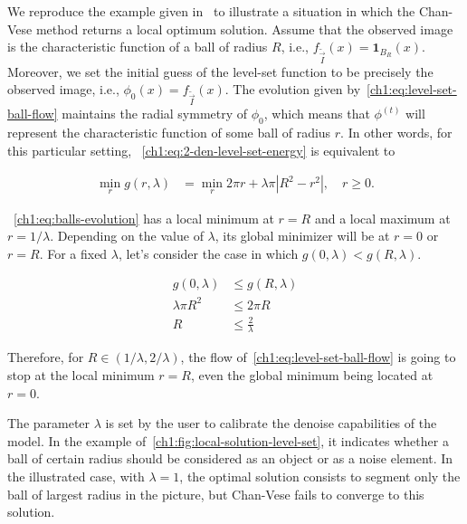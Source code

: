 We reproduce the example given in~\cite{chan06} to illustrate a situation in which the Chan-Vese method returns a local optimum solution. Assume that the observed image is the characteristic function of a ball of radius $R$, i.e., $f_{\widetilde{\vec{I}}}(x) = \mathbf{1}_{B_R}(x)$. Moreover, we set the initial guess of the level-set function to be precisely the observed image, i.e., $\phi_0(x) = f_{\widetilde{\vec{I}}}(x)$. The evolution given by~\cref{ch1:eq:level-set-ball-flow} maintains the radial symmetry of $\phi_0$, which means that $\phi^{(t)}$ will represent the characteristic function of some ball of radius $r$. In other words, for this particular setting, ~\cref{ch1:eq:2-den-level-set-energy} is equivalent to

\begin{align}
	\min_{r} g(r,\lambda) &= \min_r 2\pi r + \lambda \pi |R^2-r^2|, \quad r \geq 0.
	\label{ch1:eq:balls-evolution}
\end{align}


~\cref{ch1:eq:balls-evolution} has a local minimum at $r=R$ and a local maximum at $r=1/\lambda$. Depending on the value of $\lambda$, its global minimizer will be at $r=0$ or $r=R$. For a fixed $\lambda$, let's consider the case in which $g(0,\lambda) < g(R,\lambda)$.

\begin{align*}
	g(0,\lambda) &\leq g(R,\lambda) \\
	\lambda \pi R^2 &\leq 2\pi R \\
	R &\leq \frac{2}{\lambda}
\end{align*}

Therefore, for $R \in (1/\lambda, 2/\lambda)$, the flow of~\cref{ch1:eq:level-set-ball-flow} is going to stop at the local minimum $r=R$, even the global minimum being located at $r=0$. 

The parameter $\lambda$ is set by the user to calibrate the denoise capabilities of the model. In the example of~\cref{ch1:fig:local-solution-level-set}, it indicates whether a ball of certain radius should be considered as an object or as a noise element. In the illustrated case, with $\lambda=1$, the optimal solution consists to segment only the ball of largest radius in the picture, but Chan-Vese fails to converge to this solution.

